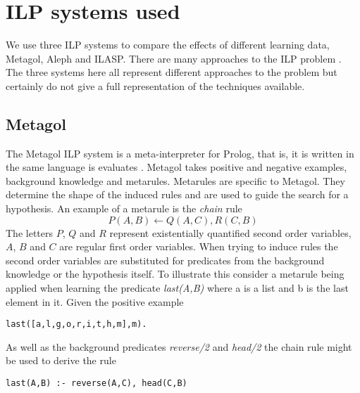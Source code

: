 \section{ILP systems used}
We use three ILP systems to compare the effects of different learning data, Metagol, Aleph and ILASP. There are many approaches to the ILP problem \cite{Svetla/ILPOverview,Cropper/NewIdeas}. The three systems here all represent different approaches to the problem but certainly do not give a full representation of the techniques available.
\subsection{Metagol}
The Metagol ILP system is a meta-interpreter for Prolog, that is, it is written in the same language is evaluates \cite{Cropper/Thesis,Rolf/Metagol,Metagol/Github}. Metagol takes positive and negative examples, background knowledge and metarules. Metarules are specific to Metagol. They determine the shape of the induced rules and are used to guide the search for a hypothesis. An example of a metarule is the \textit{chain} rule \[P(A,B) \leftarrow Q(A,C),R(C,B)\] The letters $P$, $Q$ and $R$ represent existentially quantified second order variables, $A$, $B$ and $C$ are regular first order variables. When trying to induce rules the second order variables are substituted for predicates from the background knowledge or the hypothesis itself. To illustrate this consider a metarule being applied when learning the predicate \textit{last(A,B)} where a is a list and b is the last element in it. Given the positive example
\begin{verbatim}
last([a,l,g,o,r,i,t,h,m],m).
\end{verbatim}

As well as the background predicates \textit{reverse/2} and \textit{head/2} the chain rule might be used to derive the rule
\begin{verbatim}
last(A,B) :- reverse(A,C), head(C,B)
\end{verbatim}

